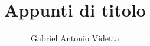 \documentclass[oneside]{book}
\theoremstyle{definition}
\begin{document}
\author{Gabriel Antonio Videtta}
\title{Appunti di {{titolo}}}

\maketitle
\newpage

\tableofcontents
\newpage


\end{document}
